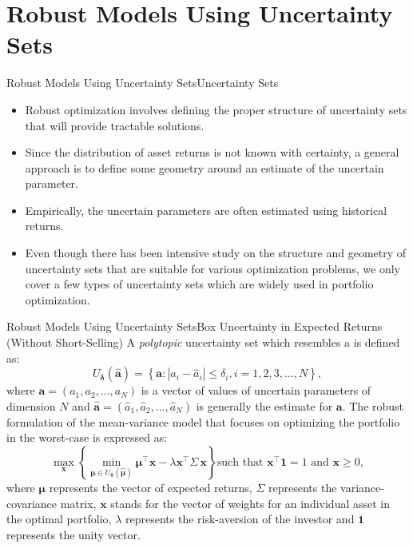 \documentclass{beamer}
\begin{document}
\section{Robust Models Using Uncertainty Sets}

\begin{frame}{Robust Models Using Uncertainty Sets}{Uncertainty Sets}
\begin{itemize}
    \item Robust optimization involves defining the proper structure of uncertainty sets that will provide tractable solutions.
    \item Since the distribution of asset returns is not known with certainty, a general approach is to define some geometry around an estimate of the uncertain parameter.
    \item Empirically, the uncertain parameters are often estimated using historical returns.
    \item Even though there has been intensive study on the structure and geometry of uncertainty sets that are suitable for various optimization problems, we only cover a few types of uncertainty sets which are widely used in portfolio optimization.
\end{itemize}
\end{frame}
\begin{frame}{Robust Models Using Uncertainty Sets}{Box Uncertainty in Expected Returns (Without Short-Selling)}
A \textit{polytopic} uncertainty set which resembles a  is defined as:
\begin{equation}
\label{eqn:box}
U_{\mathbf{\delta}}(\hat{\mathbf{a}}) = \left\{ \mathbf{a} : | a_i - \hat{a}_i| \leq \delta_i, i = 1,2,3,...,N \right\},
\end{equation}
where $\mathbf{a} = (a_1, a_2, ..., a_N)$ is a vector of values of uncertain parameters of dimension $N$ and $\mathbf{\hat{a}} = (\hat{a}_1, \hat{a}_2, ... , \hat{a}_N)$ is generally the estimate for $\mathbf{a}$.
\vfill
The robust formulation of the mean-variance
model that focuses on optimizing the portfolio in the worst-case is expressed as:
\begin{equation}
\label{eq:rf}
\max_{\mathbf{x}} \left\{ \min_{\boldsymbol{\mu} \in U_{\boldsymbol{\delta}}(\boldsymbol{\hat{\mu}})} \boldsymbol{\mu}^{\top} \mathbf{x} - \lambda \mathbf{x^{\top}}\Sigma \, \mathbf{x} \right\} \text{such that } \mathbf{x^{\top}}\mathbf{1}  = 1 \text{ and } \mathbf{x} \geq 0, 
\end{equation}
where $\boldsymbol{\mu}$ represents the vector of expected returns, $\Sigma$ represents the variance-covariance matrix, $\mathbf{x}$ stands for the vector of weights for an individual asset in the optimal portfolio, $\lambda$ represents the risk-aversion of the investor and $\mathbf{1}$ represents the unity vector.
\end{frame}
\end{document}
